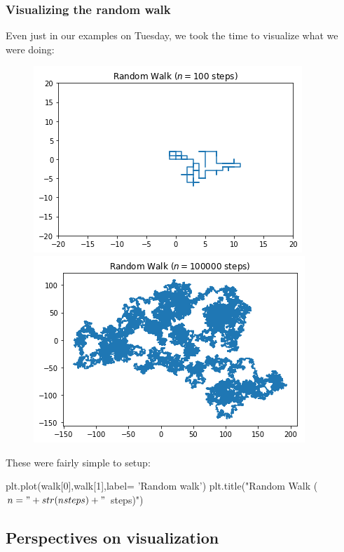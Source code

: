 \documentclass[hyperref={colorlinks=true}]{beamer}
\begin{document}

\begin{frame}[fragile]
  \frametitle{Visualizing the random walk}
  
  Even just in our examples on Tuesday, we took the time to visualize what we were doing:
  
  \begin{figure}
    \centering
    \includegraphics[width=0.45\columnwidth]{RandomWalkerFast.png}
    \includegraphics[width=0.45\columnwidth]{RandomWalkerFull.png}
  \end{figure}

  These were fairly simple to setup:
  
  \begin{ucpythonblock}{}
plt.plot(walk[0],walk[1],label= 'Random walk')
plt.title("Random Walk ($n="+str(nsteps)+"$ steps)") 
  \end{ucpythonblock}

\end{frame}

\subsection[Perspectives on visualization]{Perspectives on visualization}
\end{document}
